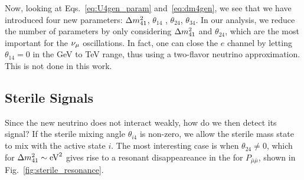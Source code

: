 Now, looking at Eqs.~\ref{eq:U4gen_param} and~\ref{eq:dm4gen}, we see that we have introduced four new parameters: $\dm[41]$, $\theta_{14}$
, $\theta_{24}$, $\theta_{34}$. In our analysis, we reduce the number of parameters by only considering $\dm[41]$ and $\theta_{24}$, which are 
the most important for the $\nu_\mu$ oscillations. In fact, one can close the $e$ channel by letting $\theta_{14} = 0$ in the \si{\GeV} to \si{\TeV} range, thus 
using a two-flavor neutrino approximation. This is not done in this work.

\subsection{Sterile Signals}
Since the new neutrino does not interact weakly, how do we then detect its signal? If the sterile mixing angle $\theta_{i4}$ is non-zero, 
we allow the sterile mass state to mix with the active state $i$. The most interesting case is when $\theta_{24} \neq 0$, 
which for $\dm[41] \sim \si{\eV \squared}$ gives rise to a resonant disappeareance in the for $P_{\bar{\mu}\bar{\mu}}$, shown in Fig.~\ref{fig:sterile_resonance}.

